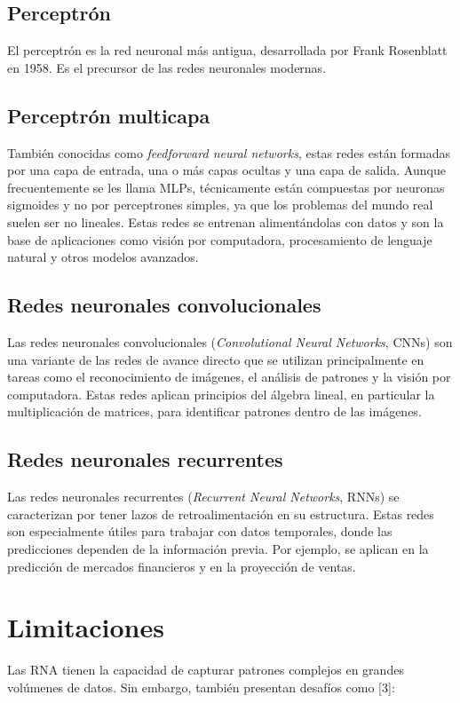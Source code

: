 \subsection{Perceptrón} 
El perceptrón es la red neuronal más antigua, desarrollada por Frank Rosenblatt en 1958. Es el precursor de las redes neuronales modernas.  

\subsection{Perceptrón multicapa} 
También conocidas como \textit{feedforward neural networks}, estas redes están formadas por una capa de entrada, una o más capas ocultas y una capa de salida. Aunque frecuentemente se les llama MLPs, técnicamente están compuestas por neuronas sigmoides y no por perceptrones simples, ya que los problemas del mundo real suelen ser no lineales. Estas redes se entrenan alimentándolas con datos y son la base de aplicaciones como visión por computadora, procesamiento de lenguaje natural y otros modelos avanzados.

\subsection{Redes neuronales convolucionales} 
Las redes neuronales convolucionales (\textit{Convolutional Neural Networks}, CNNs) son una variante de las redes de avance directo que se utilizan principalmente en tareas como el reconocimiento de imágenes, el análisis de patrones y la visión por computadora. Estas redes aplican principios del álgebra lineal, en particular la multiplicación de matrices, para identificar patrones dentro de las imágenes.

\subsection{Redes neuronales recurrentes} 
Las redes neuronales recurrentes (\textit{Recurrent Neural Networks}, RNNs) se caracterizan por tener lazos de retroalimentación en su estructura. Estas redes son especialmente útiles para trabajar con datos temporales, donde las predicciones dependen de la información previa. Por ejemplo, se aplican en la predicción de mercados financieros y en la proyección de ventas.


\section{Limitaciones}
Las RNA tienen la capacidad de capturar patrones complejos en grandes volúmenes de datos. Sin embargo, también presentan desafíos como [3]:

